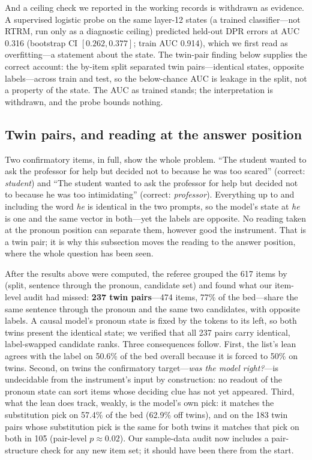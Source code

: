 \documentclass[11pt]{article}
\begin{document}
And a ceiling check we reported in the working records is withdrawn as evidence. A supervised logistic probe on the same layer-12 states (a trained classifier---not RTRM, run only as a diagnostic ceiling) predicted held-out DPR errors at AUC 0.316 (bootstrap CI $[0.262, 0.377]$; train AUC 0.914), which we first read as overfitting---a statement about the state. The twin-pair finding below supplies the correct account: the by-item split separated twin pairs---identical states, opposite labels---across train and test, so the below-chance AUC is leakage in the split, not a property of the state. The AUC as trained stands; the interpretation is withdrawn, and the probe bounds nothing.


\subsection{Twin pairs, and reading at the answer position}

Two confirmatory items, in full, show the whole problem.
``The student wanted to ask the professor for help but decided not
to because he was too scared'' (correct: \emph{student}) and ``The
student wanted to ask the professor for help but decided not to
because he was too intimidating'' (correct: \emph{professor}).
Everything up to and including the word \emph{he} is identical in
the two prompts, so the model's state at \emph{he} is one and the
same vector in both---yet the labels are opposite. No reading taken
at the pronoun position can separate them, however good the
instrument. That is a twin pair; it is why this subsection moves
the reading to the answer position, where the whole question has
been seen.

After the results above were computed, the referee grouped the 617 items by (split, sentence through the pronoun, candidate set) and found what our item-level audit had missed: \textbf{237 twin
pairs}---474 items, 77\% of the bed---share the same sentence through
the pronoun and the same two candidates, with opposite labels. A
causal model's pronoun state is fixed by the tokens to its left, so
both twins present the identical state; we verified that all 237
pairs carry identical, label-swapped candidate ranks. Three
consequences follow. First, the list's lean agrees with the label on
50.6\% of the bed overall because it is forced to 50\% on twins.
Second, on twins the confirmatory target---\emph{was the model
right?}---is undecidable from the instrument's input by construction:
no readout of the pronoun state can sort items whose deciding clue
has not yet appeared. Third, what the lean does track, weakly, is the
model's own pick: it matches the substitution pick on 57.4\% of the
bed (62.9\% off twins), and on the 183 twin pairs whose substitution
pick is the same for both twins it matches that pick on both in 105
(pair-level $p \approx 0.02$). Our sample-data audit now includes a
pair-structure check for any new item set; it should have been there
from the start.
\end{document}
